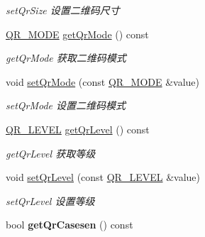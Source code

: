 \begin{DoxyCompactItemize}
\begin{DoxyCompactList}\small\item\em set\+Qr\+Size 设置二维码尺寸 \end{DoxyCompactList}\item 
\mbox{\hyperlink{class_q_qt_custom_qr_encode_widget_a57caf10e5dda4bb3f138018d083071e6}{Q\+R\+\_\+\+M\+O\+DE}} \mbox{\hyperlink{class_q_qt_custom_qr_encode_widget_aa80fd16bb5813883ba4fcf8a0ef555f3}{get\+Qr\+Mode}} () const
\begin{DoxyCompactList}\small\item\em get\+Qr\+Mode 获取二维码模式 \end{DoxyCompactList}\item 
void \mbox{\hyperlink{class_q_qt_custom_qr_encode_widget_a1a12dcfa99e06cca23b233c69b144427}{set\+Qr\+Mode}} (const \mbox{\hyperlink{class_q_qt_custom_qr_encode_widget_a57caf10e5dda4bb3f138018d083071e6}{Q\+R\+\_\+\+M\+O\+DE}} \&value)
\begin{DoxyCompactList}\small\item\em set\+Qr\+Mode 设置二维码模式 \end{DoxyCompactList}\item 
\mbox{\hyperlink{class_q_qt_custom_qr_encode_widget_a6107aaf68178d54d1274f0afc2ec310b}{Q\+R\+\_\+\+L\+E\+V\+EL}} \mbox{\hyperlink{class_q_qt_custom_qr_encode_widget_a1de7f57bb6519b51dc68916c8f229532}{get\+Qr\+Level}} () const
\begin{DoxyCompactList}\small\item\em get\+Qr\+Level 获取等级 \end{DoxyCompactList}\item 
void \mbox{\hyperlink{class_q_qt_custom_qr_encode_widget_afca08e7e77a3951096eae234f53dd400}{set\+Qr\+Level}} (const \mbox{\hyperlink{class_q_qt_custom_qr_encode_widget_a6107aaf68178d54d1274f0afc2ec310b}{Q\+R\+\_\+\+L\+E\+V\+EL}} \&value)
\begin{DoxyCompactList}\small\item\em set\+Qr\+Level 设置等级 \end{DoxyCompactList}\item 
\mbox{\label{class_q_qt_custom_qr_encode_widget_aa6e31742be912e623219b699dc541cab}} 
bool {\bfseries get\+Qr\+Casesen} () const
\item 
\mbox{\label{class_q_qt_custom_qr_encode_widget_ad48268714ff316ae80e1da15584aa775}} 

\end{DoxyCompactItemize}
